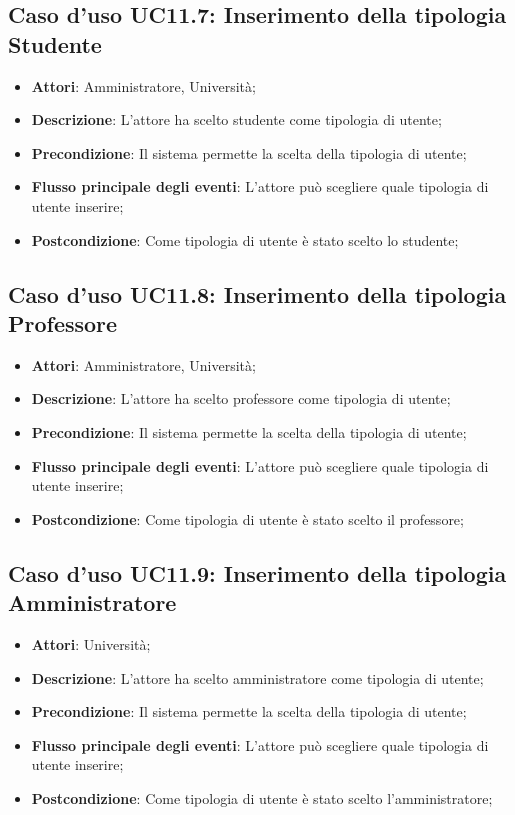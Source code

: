 \subsection{Caso d'uso \texorpdfstring{UC11.7}{UC11.7}: Inserimento della tipologia Studente}
\begin{itemize}
	\item \textbf{Attori}: Amministratore, Università;
	\item \textbf{Descrizione}: L'attore ha scelto studente come tipologia di utente; 
	\item \textbf{Precondizione}: Il sistema permette la scelta della tipologia di utente;
	\item \textbf{Flusso principale degli eventi}: L'attore può scegliere quale tipologia di utente inserire;
	\item \textbf{Postcondizione}: Come tipologia di utente è stato scelto lo studente;
\end{itemize}
\subsection{Caso d'uso \texorpdfstring{UC11.8}{UC11.8}: Inserimento della tipologia Professore}
\begin{itemize}
	\item \textbf{Attori}: Amministratore, Università;
	\item \textbf{Descrizione}: L'attore ha scelto professore come tipologia di utente; 
	\item \textbf{Precondizione}: Il sistema permette la scelta della tipologia di utente;
	\item \textbf{Flusso principale degli eventi}: L'attore può scegliere quale tipologia di utente inserire;
	\item \textbf{Postcondizione}: Come tipologia di utente è stato scelto il professore;
\end{itemize}
\subsection{Caso d'uso \texorpdfstring{UC11.9}{UC11.9}: Inserimento della tipologia Amministratore}
\begin{itemize}
	\item \textbf{Attori}: Università;
	\item \textbf{Descrizione}: L'attore ha scelto amministratore come tipologia di utente; 
	\item \textbf{Precondizione}: Il sistema permette la scelta della tipologia di utente;
	\item \textbf{Flusso principale degli eventi}: L'attore può scegliere quale tipologia di utente inserire;
	\item \textbf{Postcondizione}: Come tipologia di utente è stato scelto l'amministratore;
\end{itemize}
